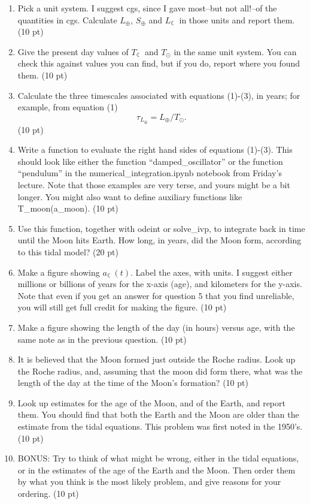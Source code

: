 \documentclass[12pt]{article}
\begin{document}
\begin{enumerate}
  \item Pick a unit system. I suggest cgs, since I gave most--but not all!--of the quantities in cgs. Calculate $L_\oplus$, $S_\oplus$ and $L_{\leftmoon}$ in those units and report them. (10 pt)

  \item Give the present day values of $T_{\leftmoon}$ and $T_\odot$ in the same unit system. You can check this against values you can find, but if you do, report where you found them. (10 pt)

  \item Calculate the three timescales associated with equations (1)-(3), in years; for example, from equation (1)
    \begin{equation}
      \tau_{L_\oplus}=L_\oplus/T_\odot.
    \end{equation}
    (10 pt)

  \item Write a function to evaluate the right hand sides of equations (1)-(3). This should look like either the function ``damped\_oscillator'' or the function ``pendulum'' in the numerical\_integration.ipynb notebook from Friday's lecture. Note that those examples are very terse, and yours might be a bit longer. You might also want to define auxiliary functions like T\_moon(a\_moon).  (10 pt)

  \item Use this function, together with odeint or solve\_ivp, to integrate back in time until the Moon hits Earth. How long, in years, did the Moon form, according to this tidal model? (20 pt)

  \item Make a figure showing $a_{\leftmoon}(t)$. Label the axes, with units. I suggest either millions or billions of years for the x-axis (age), and kilometers for the y-axis. Note that even if you get an answer for question 5 that you find unreliable, you will still get full credit for making the figure. (10 pt)

  \item Make a figure showing the length of the day (in hours) versus age, with the same note as in the previous question. (10 pt)

  \item It is believed that the Moon formed just outside the Roche radius. Look up the Roche radius, and, assuming that the moon did form there, what was the length of the day at the time of the Moon's formation? (10 pt)

  \item Look up estimates for the age of the Moon, and of the Earth, and report them. You should find that both the Earth and the Moon are older than the estimate from the tidal equations. This problem was first noted in the 1950's. (10 pt)

    \item BONUS: Try to think of what might be wrong, either in the tidal equations, or in the estimates of the age of the Earth and the Moon. Then order them by what you think is the most likely problem, and give reasons for your ordering. (10 pt)
    
\end{enumerate}
\end{document}
